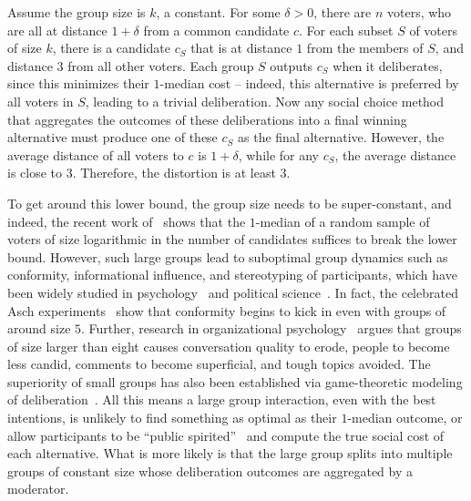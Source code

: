 \begin{example}
\label{eg1}
Assume the group size is $k$, a constant. For some $\delta > 0$, there are $n$ voters, who are all at distance $1+\delta$ from a common candidate $c$. For each subset $S$ of voters of size $k$, there is a candidate $c_S$ that is at distance $1$ from the members of $S$, and distance $3$ from all other voters. Each group $S$ outputs $c_S$ when it deliberates, since this minimizes their $1$-median cost -- indeed, this alternative is preferred by all voters in $S$, leading to a trivial deliberation. Now any social choice method that aggregates the outcomes of these deliberations into a final winning alternative must produce one of these $c_S$ as the final alternative. However, the average distance of all voters to $c$ is $1+\delta$, while for any $c_S$, the average distance is close to $3$. Therefore, the distortion is at least $3$.
\end{example}

To get around this lower bound, the group size needs to be super-constant, and indeed, the recent work of~\cite{CaragiannisM024}  shows that the $1$-median of a random sample of voters of size logarithmic in the number of candidates suffices to break the lower bound. However, such large groups lead to suboptimal group dynamics such as conformity, informational influence, and stereotyping of participants, which have been widely studied in psychology~\cite{Asch,Deutsch1955} and political science~\cite{Price}. In fact, the celebrated Asch experiments~\cite{Asch} show that conformity begins to kick in even with groups of around size $5$. Further, research in organizational psychology~\cite{axtell_2018} argues that groups of size larger than eight causes conversation quality to erode, people to become less candid, comments to become superficial, and tough topics avoided. The superiority of small groups has also been established via game-theoretic modeling of deliberation~\cite{Meirowitz}. All this means a large group interaction, even with the best intentions, is unlikely to find something as optimal as their $1$-median outcome, or allow participants to be ``public spirited''~\cite{FlaniganPW23} and compute the true social cost of each alternative. %
What is more likely is that the large group splits into multiple groups of constant size whose deliberation outcomes are aggregated by a moderator.  %

